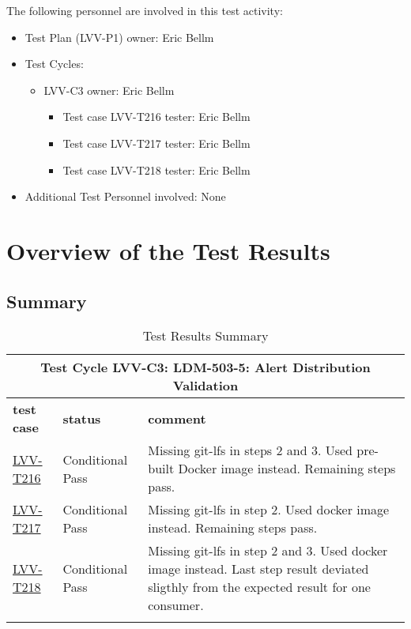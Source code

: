 \documentclass[DM,lsstdraft,STR,toc]{lsstdoc}
\begin{document}
The following personnel are involved in this test activity:

\begin{itemize}
\item Test Plan (LVV-P1) owner: Eric Bellm
\item Test Cycles:
\begin{itemize}
  \item LVV-C3 owner: 
    Eric Bellm
  \begin{itemize}
    \item Test case LVV-T216 tester: Eric Bellm
    \item Test case LVV-T217 tester: Eric Bellm
    \item Test case LVV-T218 tester: Eric Bellm
  \end{itemize}
\end{itemize}
\item Additional Test Personnel involved: None
\end{itemize}

\newpage

\section{Overview of the Test Results}
\label{sect:overview}

\subsection{Summary}
\label{sect:summarytable}

\begin{longtable} {p{}p{}p{}}
\toprule
  \multicolumn{3}{c}{ Test Cycle {\bf LVV-C3: LDM-503-5: Alert Distribution Validation }} \\\hline
  {\bf \footnotesize test case} & {\bf \footnotesize status} & {\bf \footnotesize comment} \\\toprule
    \href{https://jira.lsstcorp.org/secure/Tests.jspa#/testCase/LVV-T216}{LVV-T216} 
    & Conditional Pass & Missing git-lfs in steps 2 and 3. Used pre-built Docker image instead.
Remaining steps pass.

    \\\hline
    \href{https://jira.lsstcorp.org/secure/Tests.jspa#/testCase/LVV-T217}{LVV-T217} 
    & Conditional Pass & Missing git-lfs in step 2. Used docker image instead. Remaining steps
pass.

    \\\hline
    \href{https://jira.lsstcorp.org/secure/Tests.jspa#/testCase/LVV-T218}{LVV-T218} 
    & Conditional Pass & Missing git-lfs in step 2 and 3. Used docker image instead. Last step
result deviated sligthly from the expected result for one consumer.

    \\\hline

\caption{Test Results Summary}
\label{table:summary}
\end{longtable}
\end{document}
